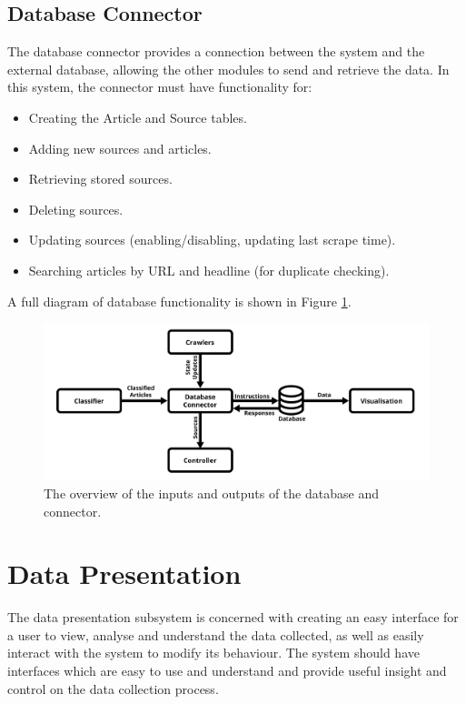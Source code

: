 \documentclass{l4proj}
\begin{document}
\subsection{Database Connector}
The database connector provides a connection between the system and the external database, allowing the other modules to send and retrieve the data. In this system, the connector must have functionality for:
\begin{itemize}
    \item Creating the Article and Source tables.
    \item Adding new sources and articles.
    \item Retrieving stored sources.
    \item Deleting sources.
    \item Updating sources (enabling/disabling, updating last scrape time).
    \item Searching articles by URL and headline (for duplicate checking). 
\end{itemize}

A full diagram of database functionality is shown in Figure \ref{fig:database_diagram}.

 \begin{figure}[h]
\centering
\includegraphics[width=\textwidth]{images/Database-diagram.png}
\caption{The overview of the inputs and outputs of the database and connector.}
\label{fig:database_diagram}
\end{figure}

\section{Data Presentation}
The data presentation subsystem is concerned with creating an easy interface for a user to view, analyse and understand the data collected, as well as easily interact with the system to modify its behaviour. The system should have interfaces which are easy to use and understand and provide useful insight and control on the data collection process.
\end{document}
